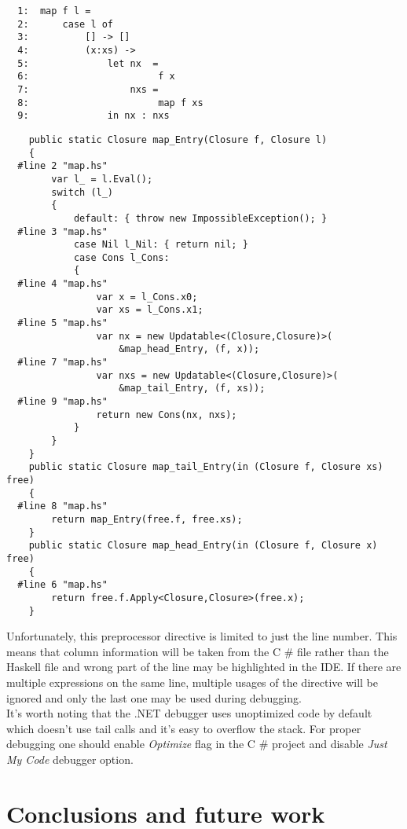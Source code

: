 \documentclass[en]{pracamgr}
\newcommand{\shrp}{%
  {\fontfamily{ppl}\selectfont\#%
  }}
\begin{document}
\begin{verbatim}
  1:  map f l =
  2:      case l of
  3:          [] -> []
  4:          (x:xs) ->
  5:              let nx  =
  6:                       f x
  7:                  nxs =
  8:                       map f xs
  9:              in nx : nxs
\end{verbatim}
\begin{verbatim}
    public static Closure map_Entry(Closure f, Closure l)
    {
  #line 2 "map.hs"
        var l_ = l.Eval();
        switch (l_)
        {
            default: { throw new ImpossibleException(); }
  #line 3 "map.hs"
            case Nil l_Nil: { return nil; }
            case Cons l_Cons:
            {
  #line 4 "map.hs"
                var x = l_Cons.x0;
                var xs = l_Cons.x1;
  #line 5 "map.hs"
                var nx = new Updatable<(Closure,Closure)>(
                    &map_head_Entry, (f, x));
  #line 7 "map.hs"
                var nxs = new Updatable<(Closure,Closure)>(
                    &map_tail_Entry, (f, xs));
  #line 9 "map.hs"
                return new Cons(nx, nxs);
            }
        }
    }
    public static Closure map_tail_Entry(in (Closure f, Closure xs) free)
    {
  #line 8 "map.hs"
        return map_Entry(free.f, free.xs);
    }
    public static Closure map_head_Entry(in (Closure f, Closure x) free)
    {
  #line 6 "map.hs"
        return free.f.Apply<Closure,Closure>(free.x);
    }
\end{verbatim}

Unfortunately, this preprocessor directive is limited to just the line number.
This means that column information will be taken from the C\shrp{} file rather than
the Haskell file and wrong part of the line may be highlighted in the IDE.
If there are multiple expressions on the same line, multiple usages of the directive
will be ignored and only the last one may be used during debugging. \\

It's worth noting that the .NET debugger uses unoptimized code by default which doesn't
use tail calls and it's easy to overflow the stack. For proper debugging one should enable
\textit{Optimize} flag in the C\shrp{} project and disable \textit{Just My Code} debugger option.

\chapter{Conclusions and future work}\label{r:future}
\end{document}
